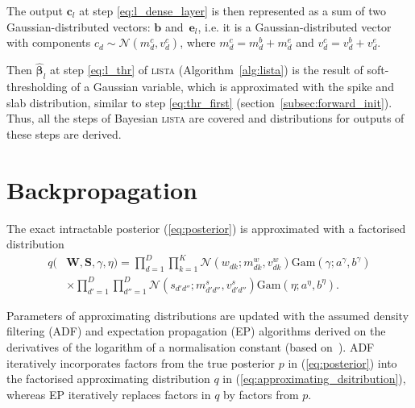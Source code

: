 \documentclass{article}
\begin{document}
  The output $\mathbf{c}_l$ at step \ref{eq:l_dense_layer} is then represented as a sum of two Gaussian-distributed vectors: $\mathbf{b}$ and~$\mathbf{e}_l$, i.e. it is a Gaussian-distributed vector with components $c_{d} \sim \mathcal{N}(m^c_{d}, v^c_{d})$, where $m^c_{d} = m^b_{d} + m^e_{d}$ and $v^c_{d} = v^b_{d} + v^e_{d}$.
  
  
  Then $\widehat{\boldsymbol\beta}_{l}$ at step \ref{eq:l_thr} of \textsc{lista} (Algorithm~\ref{alg:lista}) is the result of soft-thresholding of a Gaussian variable, which is approximated with the spike and slab distribution,  similar to step \ref{eq:thr_first} (section~\ref{subsec:forward_init}).
  Thus, all the steps of Bayesian \textsc{lista} are covered and distributions for outputs of these steps are derived.
  
  \section{Backpropagation}
  \label{sec:backpropagation}
  
  The exact intractable posterior (\ref{eq:posterior}) is approximated with a factorised distribution
  \begin{align}
  q(&\mathbf{W}, \mathbf{S}, \gamma, \eta) = \prod_{d=1}^D\prod_{k=1}^K \mathcal{N}(w_{dk} ; m^w_{dk}, v^w_{dk}) \text{Gam}(\gamma; a^\gamma, b^\gamma)\nonumber\\
  \label{eq:approximating_dsitribution}
  &\times\prod_{d'=1}^D\prod_{d''=1}^D \mathcal{N}(s_{d'd''} ; m^s_{d'd''}, v^s_{d'd''}) \text{Gam}(\eta; a^\eta, b^\eta).
  \end{align}
  
  Parameters of approximating distributions are updated with the assumed density filtering (ADF) and expectation propagation (EP) algorithms derived on the derivatives of the logarithm of a normalisation constant (based on~\cite{hernandez2015probabilistic}). ADF iteratively incorporates factors from the true posterior $p$ in (\ref{eq:posterior}) into the factorised approximating distribution $q$ in (\ref{eq:approximating_dsitribution}), whereas EP iteratively replaces factors in $q$ by factors from $p$.
  
\end{document}
